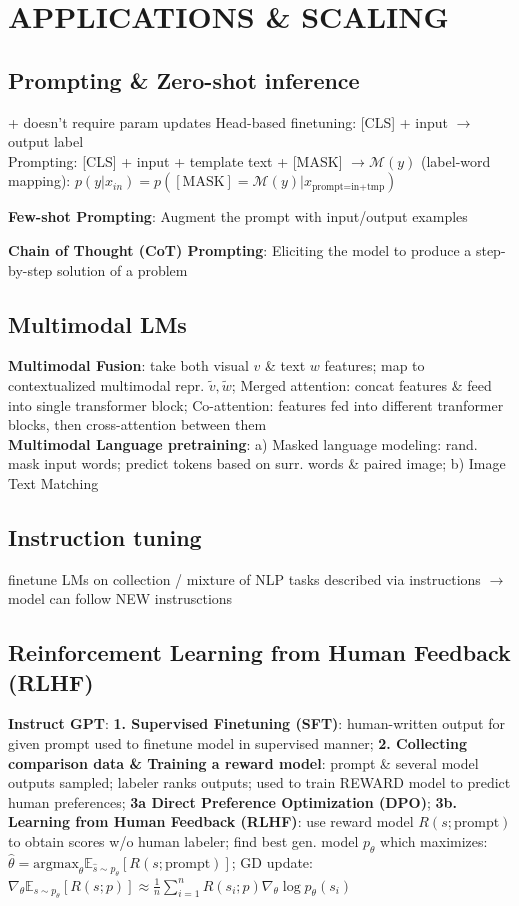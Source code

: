 \section{APPLICATIONS \& SCALING}

\subsection{Prompting \& Zero-shot inference}
\textcolor{mygreen}{+ doesn't require param updates}
Head-based finetuning: [CLS] + input $\rightarrow$ output label\\
Prompting: [CLS] + input + template text + [MASK] $\rightarrow\mathcal{M}(y)$ (label-word mapping): $p(y|x_{in}) = p([\text{MASK}]=\mathcal{M}(y)|x_{\text{prompt=in+tmp}})$

\textbf{Few-shot Prompting}: Augment the prompt with input/output examples

\textbf{Chain of Thought (CoT) Prompting}: Eliciting the model to produce a step-by-step solution of a
problem

\subsection{Multimodal LMs}
\textbf{Multimodal Fusion}: take both visual $v$ \& text $w$ features; map to contextualized multimodal repr. $\tilde{v}, \tilde{w}$; Merged attention: concat features \& feed into single transformer block; Co-attention: features fed into different tranformer blocks, then cross-attention between them\\
\textbf{Multimodal Language pretraining}: a) Masked language modeling: rand. mask input words; predict tokens based on surr. words \& paired image; b) Image Text Matching

\subsection{Instruction tuning}
finetune LMs on collection / mixture of NLP tasks described via instructions $\to$ model can follow NEW instrusctions

\subsection{Reinforcement Learning from Human Feedback (RLHF)}
\textbf{Instruct GPT}: \textbf{1. Supervised Finetuning (SFT)}: human-written output for given prompt used to finetune model in supervised manner; \textbf{2. Collecting comparison data \& Training a reward model}: prompt \& several model outputs sampled; labeler ranks outputs; used to train REWARD model to predict human preferences; \textbf{3a Direct Preference Optimization (DPO)}; \textbf{3b. Learning from Human Feedback (RLHF)}: use reward model $R(s; \text{prompt})$ to obtain scores w/o human labeler; find best gen. model $p_\theta$ which maximizes: $\hat{\theta} = \text{argmax}_\theta \mathbb{E}_{\hat{s}\sim p_\theta}[R(s; \text{prompt})]$; GD update: $\nabla_\theta \mathbb{E}_{s \sim p_\theta}[R(s;p)] \approx \frac{1}{n} \sum_{i=1}^n R(s_i;p) \nabla_\theta \log p_\theta(s_i)$



